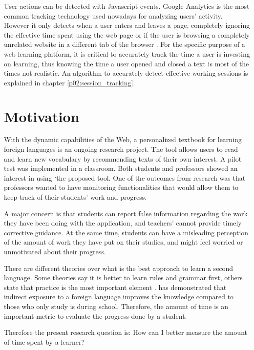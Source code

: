 User actions can be detected with Javascript events. Google Analytics is the most common tracking technology used nowadays for analyzing users' activity. However it only detects when a user enters and leaves a page, completely ignoring the effective time spent using the web page or if the user is browsing a completely unrelated website in a different tab of the browser \cite{GoogleAnalytics01} \cite{MisunderstoodMetrics}. For the specific purpose of a web learning platform, it is critical to accurately track the time a user is investing on learning, thus knowing the time a user opened and closed a text is most of the times not realistic. An algorithm to accurately detect effective working sessions is explained in chapter \ref{p02:session_tracking}.

\section{Motivation}
With the dynamic capabilities of the Web, a personalized textbook for learning foreign languages \cite{Mircea2018} is an ongoing research project. The tool allows users to read and learn new vocabulary by recommending texts of their own interest. A pilot test was implemented in a classroom. Both students and professors showed an interest in using `the proposed tool. One of the outcomes from \citeauthor{Mircea2018} research was that professors wanted to have monitoring functionalities that would allow them to keep track of their students' work and progress.

A major concern is that students can report false information regarding the work they have been doing with the application, and teachers' cannot provide timely corrective guidance. At the same time, students can have a misleading perception of the amount of work they have put on their studies, and might feel worried or unmotivated about their progress.

There are different theories over what is the best approach to learn a second language. Some theories say it is better to learn rules and grammar first, others state that practice is the most important element \cite{Ellis1993}. \citeauthor{Kuppens2010} has demonstrated that indirect exposure to a foreign language improves the knowledge compared to those who only study is during school. Therefore, the amount of time is an important metric to evaluate the progress done by a student.

Therefore the present research question is:
How can I better measure the amount of time spent by a learner?

